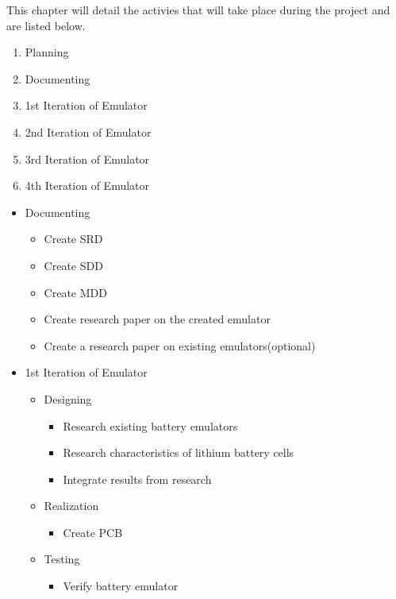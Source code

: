 This chapter will detail the activies that will take place during the project and are listed below. 

\begin{enumerate}
    \item Planning 
    \item Documenting
    \item 1st Iteration of Emulator
    \item 2nd Iteration of Emulator
    \item 3rd Iteration of Emulator
    \item 4th Iteration of Emulator
\end{enumerate}


\begin{itemize}
    \item Documenting
    \begin{itemize}
    \item Create SRD
    \item Create SDD
    \item Create MDD
    \item Create research paper on the created emulator 
    \item Create a research paper on existing emulators(optional)
    \end{itemize}

    \item 1st Iteration of Emulator
    \begin{itemize}
        \item Designing
        \begin{itemize}
            \item Research existing battery emulators 
            \item Research characteristics of lithium battery cells 
            \item Integrate results from research
        \end{itemize}
        \item Realization
        \begin{itemize}
            \item Create PCB
        \end{itemize}
        \item Testing
        \begin{itemize}
            \item Verify battery emulator
        \end{itemize}
    \end{itemize}


\end{itemize}
